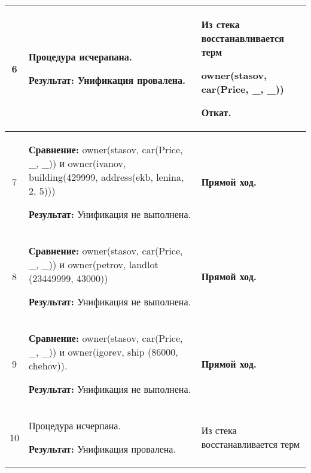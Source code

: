 \begin{longtable}{|c|p{}|p{}|}
6
                       &
  Процедура исчерапана.

  \textbf{Результат:}\newline
  Унификация провалена.
                       &
  Из стека восстанавливается терм

  owner(stasov, car(Price, \_, \_))
  \newline

  \textbf{Откат.}
                       \\ \hline

7
                       &
\textbf{Сравнение:}\newline
  owner(stasov, car(Price, \_, \_))
  \newline{}и\newline
  owner(ivanov, building(429999,   address(ekb, lenina, 2,  5)))
  \newline

  \textbf{Результат:}\newline
  Унификация не выполнена.
                       &
  \textbf{Прямой ход.}
                       \\ \hline

8
                       &
\textbf{Сравнение:}\newline
  owner(stasov, car(Price, \_, \_))
  \newline{}и\newline
  owner(petrov, landlot (23449999, 43000))
  \newline

  \textbf{Результат:}\newline
  Унификация не выполнена.
                       &
  \textbf{Прямой ход.}
                       \\ \hline

9
                       &
\textbf{Сравнение:}\newline
  owner(stasov, car(Price, \_, \_))
  \newline{}и\newline
  owner(igorev, ship    (86000,    chehov)).
  \newline

  \textbf{Результат:}\newline
  Унификация не выполнена.
                       &
  \textbf{Прямой ход.}
                       \\ \hline

10
                       &
  Процедура исчерпана.

  \textbf{Результат:}\newline
  Унификация провалена.
                       &
  Из стека восстанавливается терм


\end{longtable}
